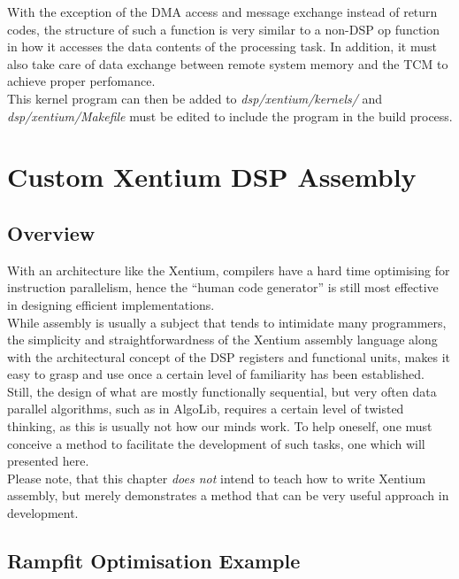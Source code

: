 \noindent
With the exception of the \gls{DMA} access and message exchange instead of return
codes, the structure of such a function is very similar to a non-DSP op function
in how it accesses the data contents of the processing task.
In addition, it must also take care of data exchange between remote system
memory and the \gls{TCM} to achieve proper perfomance.
\\

\noindent
This kernel program can then be added to \emph{dsp/xentium/kernels/} and
\emph{dsp/xentium/Makefile} must be edited to include the program in the
build process.



\chapter {Custom Xentium DSP Assembly}

\section{Overview}

With an architecture like the \gls{Xentium}, compilers have a hard time
optimising for instruction parallelism, hence the ``human code generator'' is
still most effective in designing efficient implementations. \\

While assembly is usually a subject that tends to intimidate many programmers,
the simplicity and straightforwardness of the Xentium assembly
language\cite{XenUsrGuide} along with the architectural concept of the DSP
registers and functional units, makes it easy to grasp and use once a certain
level of familiarity has been established. \\

Still, the design of what are mostly functionally sequential, but very often
data parallel algorithms, such as in AlgoLib, requires a certain level of
twisted thinking, as this is usually not how our minds work.  To help oneself,
one must conceive a method to facilitate the development of such tasks, one
which will presented here. \\

Please note, that this chapter \emph{does not} intend to teach how to write
Xentium assembly, but merely demonstrates a method that can be very useful
approach in development.


\section{Rampfit Optimisation Example}


